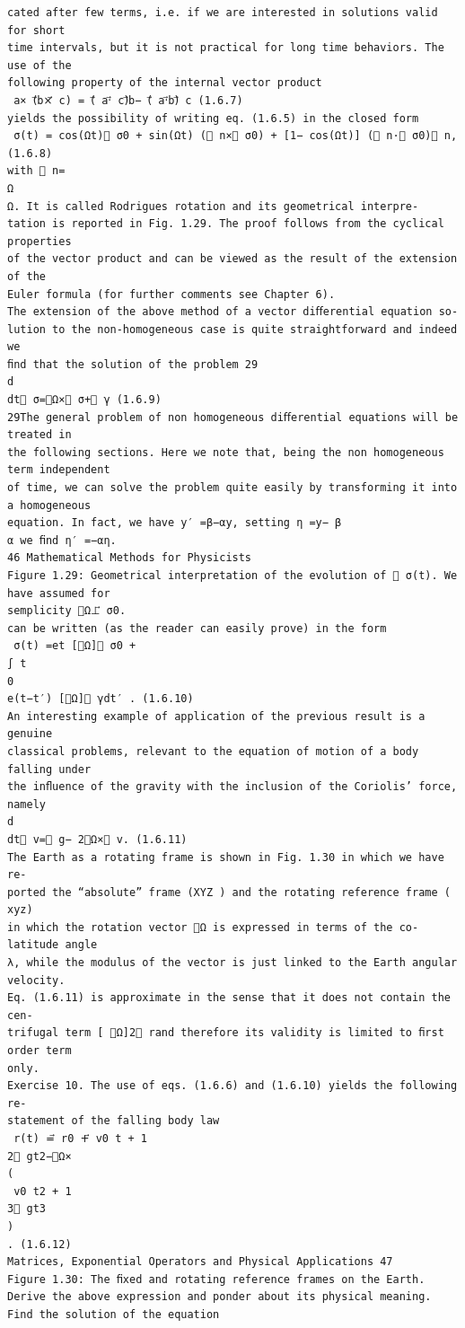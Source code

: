 \begin{verbatim}
cated after few terms, i.e. if we are interested in solutions valid for short
time intervals, but it is not practical for long time behaviors. The use of the
following property of the internal vector product
⃗ a× (⃗b×⃗ c) = (⃗ a·⃗ c)⃗b− (⃗ a·⃗b)⃗ c (1.6.7)
yields the possibility of writing eq. (1.6.5) in the closed form
⃗ σ(t) = cos(Ωt)⃗ σ0 + sin(Ωt) (⃗ n×⃗ σ0) + [1− cos(Ωt)] (⃗ n·⃗ σ0)⃗ n, (1.6.8)
with ⃗ n=
⃗Ω
Ω. It is called Rodrigues rotation and its geometrical interpre-
tation is reported in Fig. 1.29. The proof follows from the cyclical properties
of the vector product and can be viewed as the result of the extension of the
Euler formula (for further comments see Chapter 6).
The extension of the above method of a vector diﬀerential equation so-
lution to the non-homogeneous case is quite straightforward and indeed we
ﬁnd that the solution of the problem 29
d
dt⃗ σ=⃗Ω×⃗ σ+⃗ γ (1.6.9)
29The general problem of non homogeneous diﬀerential equations will be treated in
the following sections. Here we note that, being the non homogeneous term independent
of time, we can solve the problem quite easily by transforming it into a homogeneous
equation. In fact, we have y′ =β−αy, setting η =y− β
α we ﬁnd η′ =−αη.
46 Mathematical Methods for Physicists
Figure 1.29: Geometrical interpretation of the evolution of ⃗ σ(t). We have assumed for
semplicity ⃗Ω⊥⃗ σ0.
can be written (as the reader can easily prove) in the form
⃗ σ(t) =et [⃗Ω]⃗ σ0 +
∫ t
0
e(t−t′) [⃗Ω]⃗ γdt′ . (1.6.10)
An interesting example of application of the previous result is a genuine
classical problems, relevant to the equation of motion of a body falling under
the inﬂuence of the gravity with the inclusion of the Coriolis’ force, namely
d
dt⃗ v=⃗ g− 2⃗Ω×⃗ v. (1.6.11)
The Earth as a rotating frame is shown in Fig. 1.30 in which we have re-
ported the “absolute” frame (XYZ ) and the rotating reference frame ( xyz)
in which the rotation vector ⃗Ω is expressed in terms of the co-latitude angle
λ, while the modulus of the vector is just linked to the Earth angular velocity.
Eq. (1.6.11) is approximate in the sense that it does not contain the cen-
trifugal term [ ⃗Ω]2⃗ rand therefore its validity is limited to ﬁrst order term
only.
Exercise 10. The use of eqs. (1.6.6) and (1.6.10) yields the following re-
statement of the falling body law
⃗ r(t) =⃗ r0 +⃗ v0 t + 1
2⃗ gt2−⃗Ω×
(
⃗ v0 t2 + 1
3⃗ gt3
)
. (1.6.12)
Matrices, Exponential Operators and Physical Applications 47
Figure 1.30: The ﬁxed and rotating reference frames on the Earth.
Derive the above expression and ponder about its physical meaning.
Find the solution of the equation

\end{verbatim}
